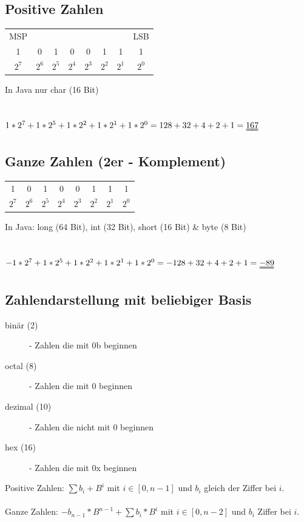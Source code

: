 \documentclass[a4paper,10pt]{article}
\begin{document}
\subsection{Positive Zahlen}
\begin{tabular}{c c c c c c c c}
	MSP & & & & & & & LSB \\
	1 & 0 & 1 & 0 & 0 & 1 & 1 & 1 \\
	$2^7$ & $2^6$ & $2^5$ & $2^4$ & $2^3$ & $2^2$ & $2^1$ & $2^0$
\end{tabular}
In Java nur char (16 Bit) \\ \\ \\
$1*2^7+1*2^5+1*2^2+1*2^1+1*2^0=128+32+4+2+1=\uuline{167}$

\subsection{Ganze Zahlen (2er - Komplement)}
\begin{tabular}{c c c c c c c c}
	1 & 0 & 1 & 0 & 0 & 1 & 1 & 1 \\
	$2^7$ & $2^6$ & $2^5$ & $2^4$ & $2^3$ & $2^2$ & $2^1$ & $2^0$
\end{tabular} 
In Java: long (64 Bit), int (32 Bit), short (16 Bit) \& byte (8 Bit) \\ \\ \\
$-1*2^7+1*2^5+1*2^2+1*2^1+1*2^0=-128+32+4+2+1=\uuline{-89}$

\subsection{Zahlendarstellung mit beliebiger Basis}
\begin{description}
	\item[bin\"ar (2)] - Zahlen die mit 0b beginnen
	\item[octal (8)] - Zahlen die mit 0 beginnen
	\item[dezimal (10)] - Zahlen die nicht mit 0 beginnen
	\item[hex (16)] - Zahlen die mit 0x beginnen
\end{description}
Positive Zahlen: $\sum b_i+B^i$ mit $i \in [0,n-1]$ und $b_i$ gleich der Ziffer bei $i$. \\ \\
Ganze Zahlen: $-b_{n-1}*B^{n-1}+\sum b_i*B^i$ mit $i \in [0,n-2]$ und  $b_i$ Ziffer bei $i$.
\end{document}
